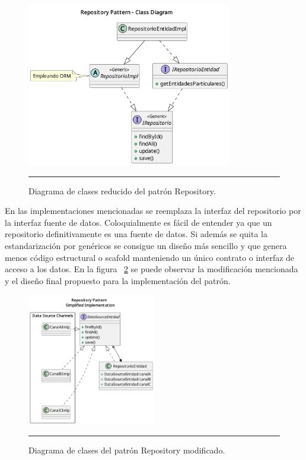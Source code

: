 \begin{figure}[htbp]
	\centering
	\includegraphics[width=0.8\textwidth]{Figures/design/CLASS_repository_less.png}
	\rule{35em}{1pt}
	\caption[Repository Pattern Detailed Class Diagram]{Diagrama de clases reducido del patrón Repository.}
	\label{fig:uml_clases_detalles_repository}
\end{figure}

En las implementaciones mencionadas se reemplaza la interfaz del repositorio por la interfaz fuente de datos. Coloquialmente es fácil de entender ya que un repositorio definitivamente es una fuente de datos. Si además se quita la estandarización por genéricos se consigue un diseño más sencillo y que genera menos código estructural o scafold manteniendo un único contrato o interfaz de acceso a los datos. En la figura ~\ref{fig:uml_clases_modif_repository} se puede observar la modificación mencionada y el diseño final propuesto para la implementación del patrón.

 \begin{figure}[htbp]
	\centering
	\includegraphics[width=0.5\textwidth]{Figures/design/CLASS_repository_reduced.png}
	\rule{35em}{1pt}
	\caption[Modified Repository Pattern Class Diagram]{Diagrama de clases del patrón Repository modificado.}
	\label{fig:uml_clases_modif_repository}
\end{figure}

